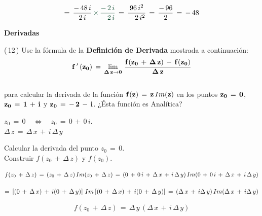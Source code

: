 \documentclass[a4paper,11pt,openany]{book}
\begin{document}
$$=\,\dfrac{-\,48\,i}{2\,i}\,\textcolor{britishracinggreen}{\times\,\dfrac{-\,2\,i}{-\,2\,i}}\,=\,\dfrac{96\,i^{2}}{-\,2\,i^{2}}\,=\,\dfrac{-\,96}{2}\,=\,-\,48$$

\begin{center}
\textbf{Derivadas}
\end{center}

\textcolor{ao(english)}{(\,12\,)} Use la fórmula de la \textbf{Definición de Derivada} mostrada a continuación:\\

$$\bf{f\,'\,(z_{0})\,=\,\displaystyle\lim_{\Delta\,z \to 0}\,\dfrac{f(z_{0}\,+\,\Delta\,z)\,-\,f(z_{0})}{\Delta\,z}}$$\\

para calcular la derivada de la función $\bf{f(z)\,=\,z\,\mathnormal{Im}(z)}$ en los puntos $\bf{z_{0}\,=\,0}$, $\bf{z_{0}\,=\,1\,+\,i}$ y $\bf{z_{0}\,=\,-\,2\,-\,i}$. ¿Ésta función es Analítica?\\

\begin{tcolorbox}[colback=ao(english)!5!white,colframe=ao(english)!75!black,fonttitle=\bfseries,title=\sf Recordemos que:]

\textcolor{ao(english)}{} $z_{0}\,=\,0 \quad\iff\quad z_{0}\,=\,0\,+\,0\,i$.\\

\textcolor{ao(english)}{} $\Delta\,z\,=\,\Delta\,x\,+\,i\,\Delta\,y$

\end{tcolorbox}


\textcolor{ao(english)}{} Calcular la derivada del punto $z_{0}\,=\,0$.\\

\textcolor{ao(english)}{} Construir $f(z_{0}\,+\,\Delta\,z)$ y $f(z_{0})$.

$$f(z_{0}\,+\,\Delta\,z)\,=\,(z_{0}\,+\,\Delta\,z)\,\mathnormal{Im}(z_{0}\,+\,\Delta\,z)\,=\,(0\,+\,0\,i\,+\,\Delta\,x\,+\,i\,\Delta\,y)\,\mathnormal{Im}(0\,+\,0\,i\,+\,\Delta\,x\,+\,i\,\Delta\,y)$$

$$=\,\left[(0\,+\,\Delta\,x)\,+\,i(0\,+\,\Delta\,y)\right]\,\mathnormal{Im}\left[(0\,+\,\Delta\,x)\,+\,i(0\,+\,\Delta\,y)\right]\,=\,(\Delta\,x\,+\,i\Delta\,y)\,\mathnormal{Im}(\Delta\,x\,+\,i\Delta\,y)$$

$$f(z_{0}\,+\,\Delta\,z)\,=\,\Delta\,y\,(\Delta\,x\,+\,i\,\Delta\,y)$$
\end{document}
